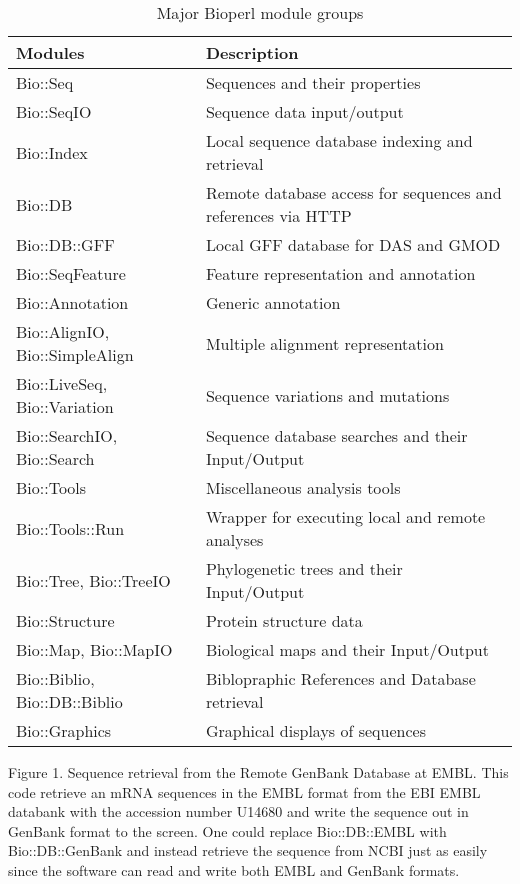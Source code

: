 \documentclass[12pt]{article}
\begin{document}
\begin{table}[h]
\begin{tabular}{|l|l|}
\hline
\textbf{Modules} & \textbf{Description} \\
\hline
Bio::Seq &  Sequences and their properties \\
Bio::SeqIO & Sequence data input/output \\
Bio::Index & Local sequence database indexing and retrieval \\ 
Bio::DB & Remote database access for sequences and references via HTTP \\
Bio::DB::GFF & Local GFF database for DAS and GMOD \\
Bio::SeqFeature & Feature representation and annotation \\
Bio::Annotation & Generic annotation \\
Bio::AlignIO, Bio::SimpleAlign & Multiple alignment representation \\
Bio::LiveSeq, Bio::Variation & Sequence variations and mutations \\
Bio::SearchIO, Bio::Search  & Sequence database searches and their Input/Output \\
Bio::Tools &  Miscellaneous analysis tools \\
Bio::Tools::Run &  Wrapper for executing local and remote analyses \\
Bio::Tree, Bio::TreeIO & Phylogenetic trees and their Input/Output  \\
Bio::Structure & Protein structure data \\
Bio::Map, Bio::MapIO & Biological maps and their Input/Output \\
Bio::Biblio, Bio::DB::Biblio & Biblopraphic References and Database
retrieval \\ 
Bio::Graphics & Graphical displays of sequences \\
\hline
\end{tabular}
\caption{Major Bioperl module groups}
\label{modules}
\end{table}

\newpage


Figure 1. Sequence retrieval from the Remote GenBank Database at EMBL.
This code retrieve an mRNA sequences in the EMBL format from the EBI
EMBL databank with the accession number U14680 and write the sequence
out in GenBank format to the screen.  One could replace Bio::DB::EMBL
with Bio::DB::GenBank and instead retrieve the sequence from NCBI just
as easily since the software can read and write both EMBL and GenBank
formats.
\end{document}
